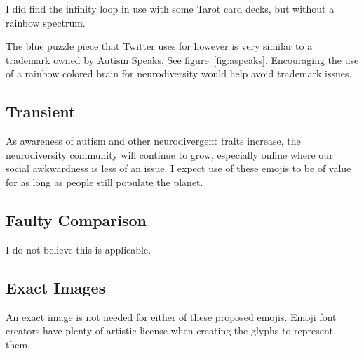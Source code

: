 I did find the infinity loop in use with some Tarot card decks, but without a rainbow spectrum.

The blue puzzle piece that Twitter uses for \jigsawemoji{} however is very
similar to a trademark owned by Autism Speaks. See figure~\ref{fig:aspeaks}. Encouraging the
use of a rainbow colored brain for neurodiversity would help avoid trademark issues.

\subsection{Transient}

As awareness of autism and other neurodivergent traits increase, the neurodiversity community
will continue to grow, especially online where our social awkwardness is less of an issue. I
expect use of these emojis to be of value for as long as people still populate the planet.

\subsection{Faulty Comparison}

I do not believe this is applicable.

\subsection{Exact Images}

An exact image is not needed for either of these proposed emojis. Emoji font creators have plenty
of artistic license when creating the glyphs to represent them.
